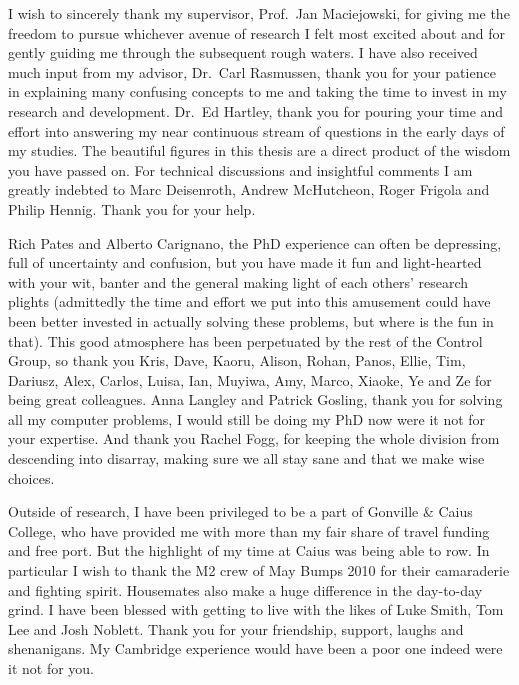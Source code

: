 \documentclass[a4paper,11pt,twoside,openright]{book}
\begin{document}
I wish to sincerely thank my supervisor, Prof.\ Jan Maciejowski, for giving me the freedom to pursue whichever avenue of research I felt most excited about and for gently guiding me through the subsequent rough waters. I have also received much input from my advisor, Dr.\ Carl Rasmussen, thank you for your patience in explaining many confusing concepts to me and taking the time to invest in my research and development. Dr.\ Ed Hartley, thank you for pouring your time and effort into answering my near continuous stream of questions in the early days of my studies. The beautiful figures in this thesis are a direct product of the wisdom you have passed on. For technical discussions and insightful comments I am greatly indebted to Marc Deisenroth, Andrew McHutcheon, Roger Frigola and Philip Hennig. Thank you for your help. 

Rich Pates and Alberto Carignano, the PhD experience can often be depressing, full of uncertainty and confusion, but you have made it fun and light-hearted with your wit, banter and the general making light of each others' research plights (admittedly the time and effort we put into this amusement could have been better invested in actually solving these problems, but where is the fun in that). This good atmosphere has been perpetuated by the rest of the Control Group, so thank you Kris, Dave, Kaoru, Alison, Rohan, Panos, Ellie, Tim, Dariusz, Alex, Carlos, Luisa, Ian, Muyiwa, Amy, Marco, Xiaoke, Ye and Ze for being great colleagues. Anna Langley and Patrick Gosling, thank you for solving all my computer problems, I would still be doing my PhD now were it not for your expertise. And thank you Rachel Fogg, for keeping the whole division from descending into disarray, making sure we all stay sane and that we make wise choices.




Outside of research, I have been privileged to be a part of Gonville \& Caius College, who have provided me with more than my fair share of travel funding and free port. But the highlight of my time at Caius was being able to row. In particular I wish to thank the M2 crew of May Bumps 2010 for their camaraderie and fighting spirit. Housemates also make a huge difference in the day-to-day grind. I have been blessed with getting to live with the likes of Luke Smith, Tom Lee and Josh Noblett. Thank you for your friendship, support, laughs and shenanigans. My Cambridge experience would have been a poor one indeed were it not for you.
\end{document}
